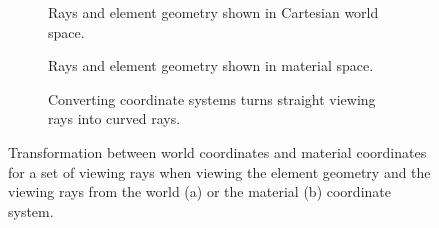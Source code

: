 \begin{figure}
\centering
\begin{subfigure}[b]{0.3\textwidth}
    \centering
    \caption{Rays and element geometry shown in Cartesian world space.}
    \label{contributions:fem:rays:world}
\end{subfigure}
\hspace*{0.15cm}
\begin{subfigure}[b]{0.3\textwidth}
    \centering
    \caption{Rays and element geometry shown in material space.}
    \label{contributions:fem:rays:xi}
\end{subfigure}
\hspace*{0.15cm}
\begin{subfigure}[b]{0.3\textwidth}
    \centering
    \caption{Converting coordinate systems turns straight viewing rays into curved rays.}
    \label{contributions:fem:rays:rays}
\end{subfigure}
\caption{Transformation between world coordinates and material coordinates for a set of viewing rays when viewing the element geometry and the viewing rays from the world (a) or the material (b) coordinate system.}
\label{contributions:fem:rays}
\end{figure}

